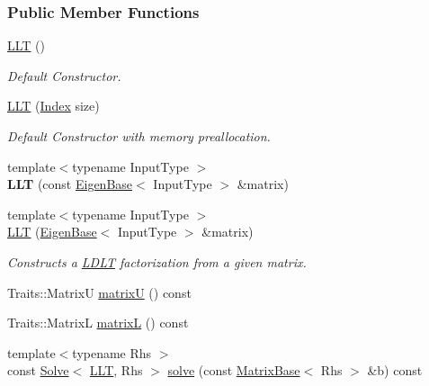 \subsubsection*{Public Member Functions}
\begin{DoxyCompactItemize}
\item 
\hyperlink{group___cholesky___module_a16d1ec9ea6497ba1febb242c2e8a7a96}{L\+LT} ()
\begin{DoxyCompactList}\small\item\em Default Constructor. \end{DoxyCompactList}\item 
\hyperlink{group___cholesky___module_ab3656cfbdf38e03c57d5cf79bf8131b6}{L\+LT} (\hyperlink{group___cholesky___module_ac7a64274814fa76e8b1e9e945546037f}{Index} size)
\begin{DoxyCompactList}\small\item\em Default Constructor with memory preallocation. \end{DoxyCompactList}\item 
\mbox{\label{group___cholesky___module_a0f9ef009097996bbf4287024a1f05836}} 
{\footnotesize template$<$typename Input\+Type $>$ }\\{\bfseries L\+LT} (const \hyperlink{group___core___module_struct_eigen_1_1_eigen_base}{Eigen\+Base}$<$ Input\+Type $>$ \&matrix)
\item 
{\footnotesize template$<$typename Input\+Type $>$ }\\\hyperlink{group___cholesky___module_a1848a00addade9a0f7f70493c52ecc9d}{L\+LT} (\hyperlink{group___core___module_struct_eigen_1_1_eigen_base}{Eigen\+Base}$<$ Input\+Type $>$ \&matrix)
\begin{DoxyCompactList}\small\item\em Constructs a \hyperlink{group___cholesky___module_class_eigen_1_1_l_d_l_t}{L\+D\+LT} factorization from a given matrix. \end{DoxyCompactList}\item 
Traits\+::\+MatrixU \hyperlink{group___cholesky___module_a18a390f085567e650e8345cc7e7c0df8}{matrixU} () const
\item 
Traits\+::\+MatrixL \hyperlink{group___cholesky___module_a7f4a3eedbf82e7ce2d6bf0dcd84cdfa3}{matrixL} () const
\item 
{\footnotesize template$<$typename Rhs $>$ }\\const \hyperlink{group___core___module_class_eigen_1_1_solve}{Solve}$<$ \hyperlink{group___cholesky___module_class_eigen_1_1_l_l_t}{L\+LT}, Rhs $>$ \hyperlink{group___cholesky___module_a3738bb3ce6f9b837a2beb432b937499f}{solve} (const \hyperlink{group___core___module_class_eigen_1_1_matrix_base}{Matrix\+Base}$<$ Rhs $>$ \&b) const

\end{DoxyCompactItemize}

